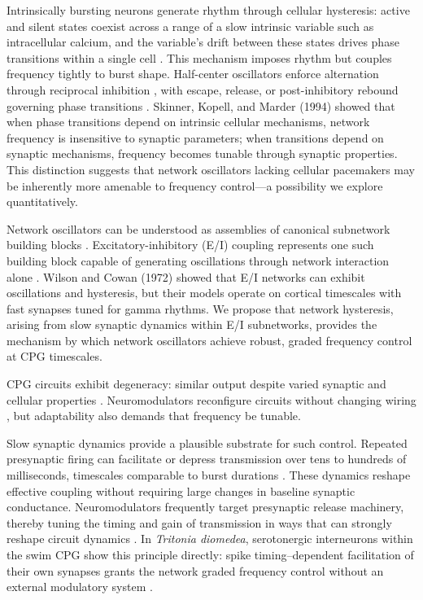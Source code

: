 Intrinsically bursting neurons generate rhythm through cellular hysteresis: active and silent states coexist across a range of a slow intrinsic variable such as intracellular calcium, and the variable's drift between these states drives phase transitions within a single cell \cite{Rinzel87b, RL87}.
This mechanism imposes rhythm but couples frequency tightly to burst shape.
Half-center oscillators enforce alternation through reciprocal inhibition \cite{brown}, with escape, release, or post-inhibitory rebound governing phase transitions \cite{Wang-Rinzel-92, SKM94}.
Skinner, Kopell, and Marder (1994) showed that when phase transitions depend on intrinsic cellular mechanisms, network frequency is insensitive to synaptic parameters; when transitions depend on synaptic mechanisms, frequency becomes tunable through synaptic properties.
This distinction suggests that network oscillators lacking cellular pacemakers may be inherently more amenable to frequency control---a possibility we explore quantitatively.

Network oscillators can be understood as assemblies of canonical subnetwork building blocks \cite{Getting1989}.
Excitatory-inhibitory (E/I) coupling represents one such building block capable of generating oscillations through network interaction alone \cite{WilsonCowan1972}.
Wilson and Cowan (1972) showed that E/I networks can exhibit oscillations and hysteresis, but their models operate on cortical timescales with fast synapses tuned for gamma rhythms.
We propose that network hysteresis, arising from slow synaptic dynamics within E/I subnetworks, provides the mechanism by which network oscillators achieve robust, graded frequency control at CPG timescales.

CPG circuits exhibit degeneracy: similar output despite varied synaptic and cellular properties \cite{MarderCalabrese1996, Marder2011}.
Neuromodulators reconfigure circuits without changing wiring \cite{NusbaumBeenhakker2002, JingWeiss2005}, but adaptability also demands that frequency be tunable.

Slow synaptic dynamics provide a plausible substrate for such control.
Repeated presynaptic firing can facilitate or depress transmission over tens to hundreds of milliseconds, timescales comparable to burst durations \cite{zucker2002short, jackman2017mechanisms}.
These dynamics reshape effective coupling without requiring large changes in baseline synaptic conductance.
Neuromodulators frequently target presynaptic release machinery, thereby tuning the timing and gain of transmission in ways that can strongly reshape circuit dynamics \cite{NadimBucher2014}.
In \textit{Tritonia diomedea}, serotonergic interneurons within the swim CPG show this principle directly: spike timing--dependent facilitation of their own synapses grants the network graded frequency control without an external modulatory system \cite{katz1994dynamic, sakurai2003spike}.

